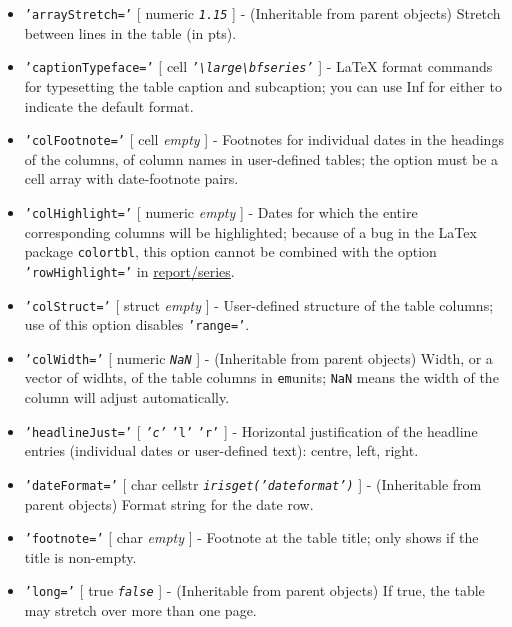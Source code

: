 \begin{itemize}
 \item
   \texttt{'arrayStretch='} {[} numeric \textbar{} \emph{\texttt{1.15}}
   {]} - (Inheritable from parent objects) Stretch between lines in the
   table (in pts).
 \item
   \texttt{'captionTypeface='} {[} cell \textbar{}
   \emph{\texttt{'\textbackslash{}large\textbackslash{}bfseries'}} {]} -
   LaTeX format commands for typesetting the table caption and
   subcaption; you can use Inf for either to indicate the default format.
 \item
   \texttt{'colFootnote='} {[} cell \textbar{} \emph{empty} {]} -
   Footnotes for individual dates in the headings of the columns, of
   column names in user-defined tables; the option must be a cell array
   with date-footnote pairs.
 \item
   \texttt{'colHighlight='} {[} numeric \textbar{} \emph{empty} {]} -
   Dates for which the entire corresponding columns will be highlighted;
   because of a bug in the LaTex package \texttt{colortbl}, this option
   cannot be combined with the option \texttt{'rowHighlight='} in
   \url{report/series}.
 \item
   \texttt{'colStruct='} {[} struct \textbar{} \emph{empty} {]} -
   User-defined structure of the table columns; use of this option
   disables \texttt{'range='}.
 \item
   \texttt{'colWidth='} {[} numeric \textbar{} \emph{\texttt{NaN}} {]} -
   (Inheritable from parent objects) Width, or a vector of widhts, of the
   table columns in \texttt{em}units; \texttt{NaN} means the width of the
   column will adjust automatically.
 \item
   \texttt{'headlineJust='} {[} \emph{\texttt{'c'}} \textbar{}
   \texttt{'l'} \textbar{} \texttt{'r'} {]} - Horizontal justification of
   the headline entries (individual dates or user-defined text): centre,
   left, right.
 \item
   \texttt{'dateFormat='} {[} char \textbar{} cellstr \textbar{}
   \emph{\texttt{irisget('dateformat')}} {]} - (Inheritable from parent
   objects) Format string for the date row.
 \item
   \texttt{'footnote='} {[} char \textbar{} \emph{empty} {]} - Footnote
   at the table title; only shows if the title is non-empty.
 \item
   \texttt{'long='} {[} true \textbar{} \emph{\texttt{false}} {]} -
   (Inheritable from parent objects) If true, the table may stretch over
   more than one page.

\end{itemize}
